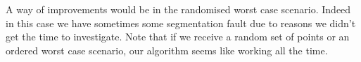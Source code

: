 A way of improvements would be in the randomised worst case scenario. Indeed in this case we have sometimes some segmentation fault due to reasons we didn't get the time to investigate. Note that if we receive a random set of points or an ordered worst case scenario, our algorithm seems like working all the time.